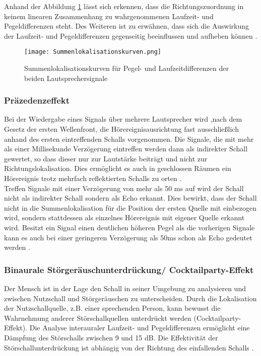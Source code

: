 Anhand der Abbildung \ref{fig:Summenlokalisationskurven} lässt sich erkennen, dass die Richtungszuordnung in keinem linearen Zusammenhang zu wahrgenommenen Laufzeit- und Pegeldifferenzen steht. Des Weiteren ist zu erwähnen, dass sich die Auswirkung der Laufzeit- und Pegeldifferenzen gegenseitig beeinflussen und aufheben können \cite[S.103]{HdA08}. 
 
\begin{figure}[H]
\centering
\texttt{[image: Summenlokalisationskurven.png]}
\caption{Summenlokalisationskurven für Pegel- und Laufzeitdifferenzen der beiden Lautsprechersignale} 
\label{fig:Summenlokalisationskurven}
\end{figure}

\subsubsection{Präzedenzeffekt}

Bei der Wiedergabe eines Signals über mehrere Lautsprecher wird ,nach dem Gesetz der ersten Wellenfront, die Hörereignisausrichtung fast ausschließlich anhand des ersten eintreffenden Schalls vorgenommen. Die Signale, die mit mehr als einer Millisekunde Verzögerung eintreffen werden dann als indirekter Schall gewertet, so dass dieser nur zur Lautstärke beiträgt und nicht zur Richtungslokalisation. Dies ermöglicht es auch in geschlossen Räumen ein Hörereignis trotz mehrfach reflektierten Schalls zu orten \cite[S.103]{HdA08}. \\

Treffen Signale mit einer Verzögerung von mehr als 50 ms auf wird der Schall nicht als indirekter Schall sondern als Echo erkannt. Dies bewirkt, dass der Schall nicht in die Summenlokalisation für die Position der ersten Quelle  mit einbezogen wird, sondern stattdessen als einzelnes Hörereignis mit eigener Quelle erkannt wird. Besitzt ein Signal einen deutlichen höheren Pegel als die vorherigen Signale kann es auch bei einer geringeren Verzögerung als 50ms schon als Echo gedeutet werden \cite[S.49]{Genuit10}. 
 

\subsubsection{Binaurale Störgeräuschunterdrückung/ Cocktailparty-Effekt}

Der Mensch ist in der Lage den Schall in seiner Umgebung zu analysieren und zwischen Nutzschall und Störgeräuschen zu unterscheiden. Durch die Lokalisation der Nutzschallquelle, z.B. einer sprechenden Person, kann bewusst die Wahrnehmung anderer Störschallquellen unterdrückt werden (Cocktailparty-Effekt). Die Analyse interauraler Laufzeit- und Pegeldifferenzen ermöglicht eine Dämpfung des Störschalls zwischen 9 und 15 dB. Die Effektivität der Störschallunterdrückung ist abhängig von der Richtung des einfallenden Schalls \cite[S.48]{Genuit10}. 

